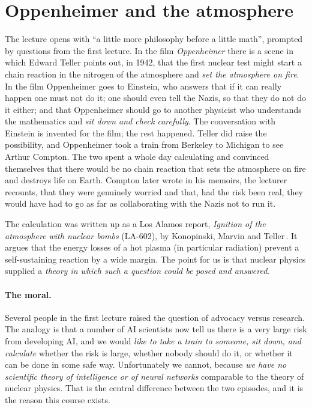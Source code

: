 \section{Oppenheimer and the atmosphere}\label{sec:L2-oppenheimer}
The lecture opens with ``a little more philosophy before a little math'', prompted by questions from the first lecture. In the film \emph{Oppenheimer} there is a scene in which Edward Teller
points out, in 1942, that the first nuclear test might start a chain reaction in the nitrogen of the atmosphere and \emph{set the atmosphere on fire}. In the film Oppenheimer goes to Einstein, who answers that if it can really happen one must not do it; one should even tell the Nazis, so that they do not do it either; and
that Oppenheimer should go to another physicist who understands the mathematics and \emph{sit down and check carefully}. The conversation with Einstein is invented for the film; the rest happened. Teller did raise the possibility, and Oppenheimer
took a train from Berkeley to Michigan to see Arthur Compton. The two spent a whole day calculating and convinced themselves that there would be no chain reaction that sets the atmosphere on fire and destroys life on Earth.
Compton later wrote in his memoirs, the lecturer recounts, that they were genuinely worried and that, had the risk been real, they would have had to go as far as collaborating with the Nazis not to run it.

\begin{beyond}
The calculation was written up as a Los Alamos report, \emph{Ignition of the atmosphere with nuclear bombs} (LA-602), by Konopinski, Marvin and Teller\,\citep{konopinski1946}. It argues that the energy losses of a hot plasma (in particular radiation) prevent a self-sustaining reaction by a wide margin.
The point for us is that nuclear physics supplied a \emph{theory in which such a question could be posed and answered}.
\end{beyond}

\paragraph{The moral.}
Several people in the first lecture raised the question of advocacy versus research. The analogy is that a number of AI scientists now tell us there is a very large risk from developing AI, and we would
\emph{like to take a train to someone, sit down, and calculate} whether the risk is large, whether nobody should do it, or whether it can be done in some safe way. Unfortunately we cannot, because \emph{we have no scientific theory of intelligence or of neural networks} comparable to the theory of nuclear physics. That is the central difference between the two episodes, and it is the reason this course exists.

